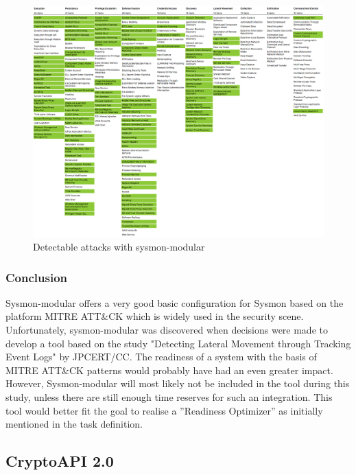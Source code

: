 \begin{figure}[H]
    \centering
    \includegraphics[width=1\linewidth]{assets/sysmon-modular/sysmon-modular.png}
    \caption{Detectable attacks with sysmon-modular}\label{fig:sysmonmodular}
\end{figure}

\subsubsection{Conclusion}
Sysmon-modular offers a very good basic configuration for Sysmon based on the platform MITRE ATT\&CK which is widely used in the security scene. Unfortunately, sysmon-modular was discovered when decisions were made to develop a tool based on the study "Detecting Lateral Movement through Tracking Event Logs" by JPCERT/CC. The readiness of a system with the basis of MITRE ATT\&CK patterns would probably have had an even greater impact. However, Sysmon-modular will most likely not be included in the tool during this study, unless there are still enough time reserves for such an integration. This tool would better fit the goal to realise a ''Readiness Optimizer'' as initially mentioned in the task definition.



\subsection{CryptoAPI 2.0}
